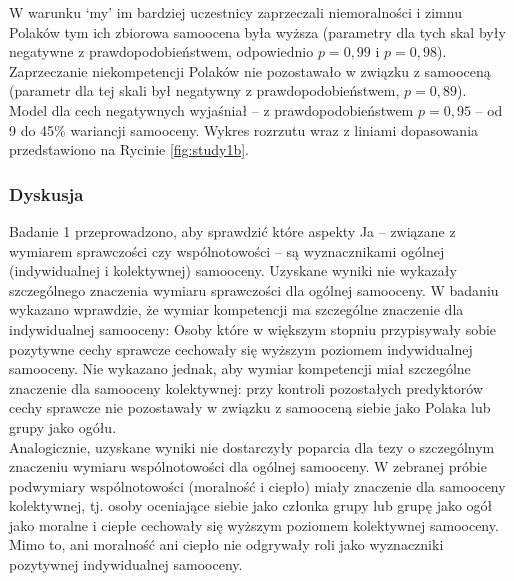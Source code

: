 \documentclass[man]{apa6}
\begin{document}
W warunku `my' im bardziej uczestnicy zaprzeczali niemoralności i zimnu Polaków tym ich zbiorowa samoocena była wyższa (parametry dla tych skal były negatywne z prawdopodobieństwem, odpowiednio $p = 0,99$ i $p = 0,98$). Zaprzeczanie niekompetencji Polaków nie pozostawało w związku z samooceną (parametr dla tej skali był negatywny z prawdopodobieństwem, $p = 0,89$).\\

Model dla cech negatywnych wyjaśniał -- z prawdopodobieństwem $p = 0,95$ -- od 9 do 45\% wariancji samooceny. Wykres rozrzutu wraz z liniami dopasowania przedstawiono na Rycinie \ref{fig:study1b}.


\begin{figure*}[htbp]
   \centering
   \caption{Przypisywanie sobie (ja vs. ja jako Polak vs. my Polacy) negatywnych cech związanych w wymiarami kompetencji, moralności i ciepła, a poziom samooceny indywidualnej oraz kolektywnej. Punkty oznaczają latentne wyniki dla każdej osoby, natomiast pionowe i poziome kreski oznaczają błędy pomiarowe skal. Grubą linią przerywaną oznaczono najlepsze dopasowanie uzyskane w modelu regresyjnym, z cieńszymi liniami oznaczającymi błąd oszacowania.}
   \label{fig:study1b}
\end{figure*}

\subsubsection{Dyskusja}

Badanie 1 przeprowadzono, aby sprawdzić które aspekty Ja -- związane z wymiarem sprawczości czy wspólnotowości -- są wyznacznikami ogólnej (indywidualnej i kolektywnej) samooceny. Uzyskane wyniki nie wykazały szczególnego znaczenia wymiaru sprawczości dla ogólnej samooceny. W badaniu wykazano wprawdzie, że wymiar kompetencji ma szczególne znaczenie dla indywidualnej samooceny: Osoby które w większym stopniu przypisywały sobie pozytywne cechy sprawcze cechowały się wyższym poziomem indywidualnej samooceny. Nie wykazano jednak, aby wymiar kompetencji miał szczególne znaczenie dla samooceny kolektywnej: przy kontroli pozostałych predyktorów cechy sprawcze nie pozostawały w związku z samooceną siebie jako Polaka lub grupy jako ogółu. \\

Analogicznie, uzyskane wyniki nie dostarczyły poparcia dla tezy o szczególnym znaczeniu wymiaru wspólnotowości dla ogólnej samooceny. W zebranej próbie podwymiary wspólnotowości (moralność i ciepło) miały znaczenie dla samooceny kolektywnej, tj. osoby oceniające siebie jako członka grupy lub grupę jako ogół jako moralne i ciepłe cechowały się wyższym poziomem kolektywnej samooceny. Mimo to, ani moralność ani ciepło nie odgrywały roli jako wyznaczniki pozytywnej indywidualnej samooceny.\\
\end{document}

